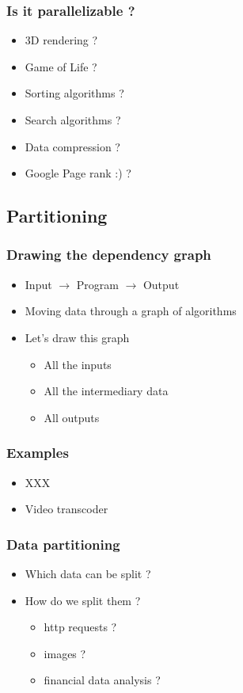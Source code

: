 \begin{frame}
  \frametitle{Is it parallelizable ?}

  \begin{itemize}
  \item 3D rendering ?
  \item Game of Life ?
  \item Sorting algorithms ?
  \item Search algorithms ?
  \item Data compression ?
  \item Google Page rank :) ?
  \end{itemize}
\end{frame}



\subsection{Partitioning}
\label{subsec:datadeps}

\begin{frame}
  \frametitle{Drawing the dependency graph}

  \begin{itemize}
  \item Input $\rightarrow$ Program $\rightarrow$ Output
  \item Moving data through a graph of algorithms
  \item Let's draw this graph
    \begin{itemize}
    \item All the inputs
    \item All the intermediary data
    \item All outputs
    \end{itemize}
  \end{itemize}
\end{frame}

\begin{frame}
  \frametitle{Examples}
  \begin{itemize}
  \item XXX
  \item Video transcoder
  \end{itemize}
\end{frame}

\begin{frame}
  \frametitle{Data partitioning}
  \begin{itemize}
  \item Which data can be split ?
  \item How do we split them ?
    \begin{itemize}
    \item http requests ?
    \item images ?
    \item financial data analysis ?
    \end{itemize}
  \end{itemize}
\end{frame}

